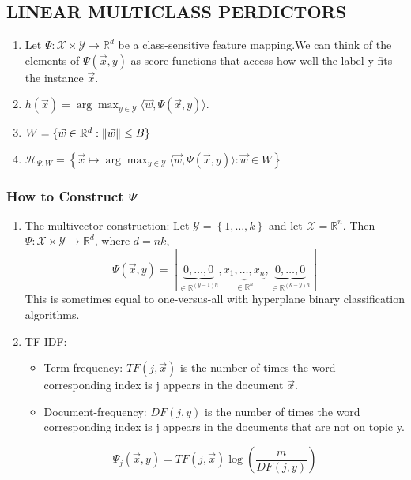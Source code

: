 \subsection{LINEAR MULTICLASS PERDICTORS}%
\begin{enumerate}
    \item Let $ \Psi: \mathcal{X}\times\mathcal{Y} \rightarrow \mathbb{R}^d $ be a class-sensitive feature mapping.We can think of the elements of $ \Psi(\vec{x}, y) $ as score functions that access how well the label y fits the instance $\vec{x}$.
    \item $ h(\vec{x}) = \arg\max_{y\in \mathcal{Y}} \langle \vec{w}, \Psi(\vec{x}, y) \rangle $.
    \item $ W = \{\vec{w} \in \mathbb{R}^{d}: {\Arrowvert \vec{w} \Arrowvert} \le B\} $
    \item $ \mathcal{H}_{\Psi, W} = \left\{ \vec{x} \mapsto \arg\max_{y \in \mathcal{Y}} \langle \vec{w}, \Psi(\vec{x},y) \rangle: \vec{w} \in W \right\} $
\end{enumerate}

\subsubsection{How to Construct $ \Psi $}%

\begin{enumerate}
    \item The multivector construction: Let $ \mathcal{Y} = \left\{ 1, \ldots, k \right\} $ and let $ \mathcal{X} = \mathbb{R}^n $. Then $ \Psi: \mathcal{X} \times \mathcal{Y} \rightarrow \mathbb{R}^d $, where $ d = nk $,
        \[
            \Psi(\vec{x}, y) = [\underbrace{0, \ldots, 0}_{\in \mathbb{R}^{(y-1)n}}, \underbrace{x_1, \ldots, x_n}_{\in \mathbb{R}^n}, \underbrace{0, \ldots, 0}_{\in \mathbb{R}^{(k-y)n}}]
        \]
        This is sometimes equal to one-versus-all with hyperplane binary classification algorithms.
    \item {TF-IDF}:
        \begin{itemize}
            \item Term-frequency: $ TF(j, \vec{x}) $ is the number of times the word corresponding index is j appears in the document $ \vec{x} $.
            \item Document-frequency: $ DF(j, y) $ is the number of times the word corresponding index is j appears in the documents that are not on topic y.
        \end{itemize}
        \[
            \Psi_j(\vec{x}, y) = TF(j,\vec{x}) \log\left( \frac{m}{DF(j,y)} \right)
        \]
\end{enumerate}

